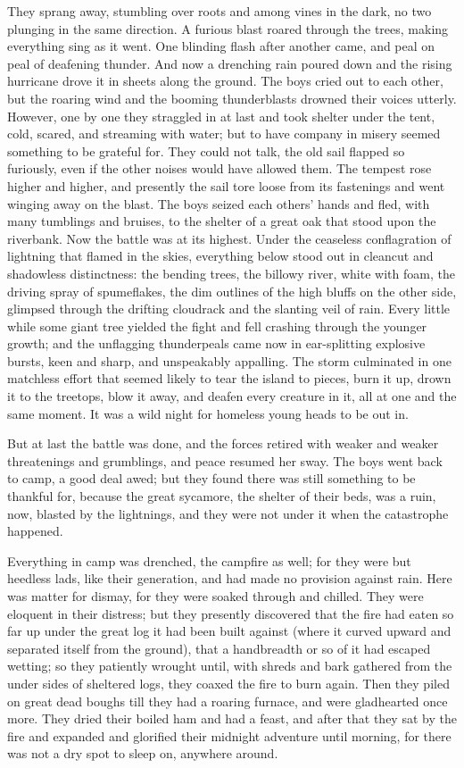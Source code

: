 \documentclass{book}
\begin{document}
They sprang away, stumbling over roots and among vines in the dark, no two plunging in the same direction. A furious blast roared through the trees, making everything sing as it went. One blinding flash after another came, and peal on peal of deafening thunder. And now a drenching rain poured down and the rising hurricane drove it in sheets along the ground. The boys cried out to each other, but the roaring wind and the booming thunderblasts drowned their voices utterly. However, one by one they straggled in at last and took shelter under the tent, cold, scared, and streaming with water; but to have company in misery seemed something to be grateful for. They could not talk, the old sail flapped so furiously, even if the other noises would have allowed them. The tempest rose higher and higher, and presently the sail tore loose from its fastenings and went winging away on the blast. The boys seized each others’ hands and fled, with many tumblings and bruises, to the shelter of a great oak that stood upon the riverbank. Now the battle was at its highest. Under the ceaseless conflagration of lightning that flamed in the skies, everything below stood out in cleancut and shadowless distinctness: the bending trees, the billowy river, white with foam, the driving spray of spumeflakes, the dim outlines of the high bluffs on the other side, glimpsed through the drifting cloudrack and the slanting veil of rain. Every little while some giant tree yielded the fight and fell crashing through the younger growth; and the unflagging thunderpeals came now in ear-splitting explosive bursts, keen and sharp, and unspeakably appalling. The storm culminated in one matchless effort that seemed likely to tear the island to pieces, burn it up, drown it to the treetops, blow it away, and deafen every creature in it, all at one and the same moment. It was a wild night for homeless young heads to be out in.

But at last the battle was done, and the forces retired with weaker and weaker threatenings and grumblings, and peace resumed her sway. The boys went back to camp, a good deal awed; but they found there was still something to be thankful for, because the great sycamore, the shelter of their beds, was a ruin, now, blasted by the lightnings, and they were not under it when the catastrophe happened.

Everything in camp was drenched, the campfire as well; for they were but heedless lads, like their generation, and had made no provision against rain. Here was matter for dismay, for they were soaked through and chilled. They were eloquent in their distress; but they presently discovered that the fire had eaten so far up under the great log it had been built against (where it curved upward and separated itself from the ground), that a handbreadth or so of it had escaped wetting; so they patiently wrought until, with shreds and bark gathered from the under sides of sheltered logs, they coaxed the fire to burn again. Then they piled on great dead boughs till they had a roaring furnace, and were gladhearted once more. They dried their boiled ham and had a feast, and after that they sat by the fire and expanded and glorified their midnight adventure until morning, for there was not a dry spot to sleep on, anywhere around.
\end{document}
